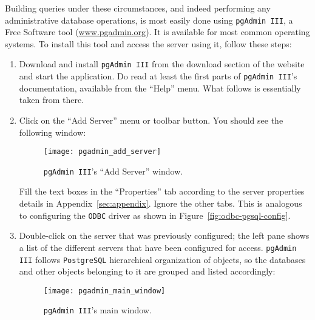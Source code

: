 \documentclass[12pt,letterpaper,titlepage,headings=small,numbers=noenddot]%
{scrartcl}
\begin{document}
Building queries under these circumstances, and indeed performing any
administrative database operations, is most easily done using
\texttt{pgAdmin III}, a Free Software tool (\url{www.pgadmin.org}).  It is
available for most common operating systems.  To install this tool and
access the server using it, follow these steps:

\begin{enumerate}[\bfseries 1.]

\item Download and install \texttt{pgAdmin III} from the download section
  of the website and start the application.  Do read at least the first
  parts of \texttt{pgAdmin III}'s documentation, available from the
  ``Help'' menu.  What follows is essentially taken from there.
\item Click on the ``Add Server'' menu or toolbar button.  You should see
  the following window:

  \begin{figure}[!tbh]
    \begin{center}
      \begin{minipage}[t]{0.5\textwidth}
        \texttt{[image: pgadmin\_add\_server]}
        \caption{\texttt{pgAdmin III}'s ``Add Server'' window.}
        \label{fig:pgadmin-server-config}
      \end{minipage}
    \end{center}
  \end{figure}

  Fill the text boxes in the ``Properties'' tab according to the server
  properties details in Appendix~\ref{sec:appendix}.  Ignore the other
  tabs.  This is analogous to configuring the \texttt{ODBC} driver as shown
  in Figure~\ref{fig:odbc-pgsql-config}.  \item Double-click on the server
  that was previously configured; the left pane shows a list of the
  different servers that have been configured for access.  \texttt{pgAdmin
    III} follows \texttt{PostgreSQL} hierarchical organization of objects,
  so the databases and other objects belonging to it are grouped and listed
  accordingly:

  \begin{figure}[!tbh]
    \begin{center}
      \begin{minipage}[t]{\textwidth}
        \texttt{[image: pgadmin\_main\_window]}
        \caption{\texttt{pgAdmin III}'s main window.}
        \label{fig:pgadmin-main}
      \end{minipage}
    \end{center}
  \end{figure}

\end{enumerate}
\end{document}

